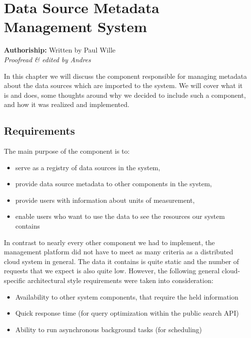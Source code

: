 \section{Data Source Metadata Management System}\label{sec:metadata}

\textbf{Authoriship: } Written by Paul Wille\\
\emph{Proofread \& edited by Andres} \\

\vspace*{4mm}

In this chapter we will discuss the component responsible for managing
metadata about the data sources which are imported to the system. We
will cover what it is and does, some thoughts around why we decided to
include such a component, and how it was realized and implemented.

\subsection{Requirements}\label{requirements}

The main purpose of the component is to:

\begin{itemize}
\tightlist
\item
  serve as a registry of data sources in the system,
\item
  provide data source metadata to other components in the system,
\item
  provide users with information about units of measurement,
\item
  enable users who want to use the data to see the resources our system
  contains
\end{itemize}

In contrast to nearly every other component we had to implement, the
management platform did not have to meet as many criteria as a
distributed cloud system in general. The data it contains is quite
static and the number of requests that we expect is also quite low.
However, the following general cloud-specific architectural style
requirements were taken into consideration:

\begin{itemize}
\tightlist
\item
  Availability to other system components, that require the held
  information
\item
  Quick response time (for query optimization within the public search
  API)
\item
  Ability to run asynchronous background tasks (for scheduling)
\end{itemize}

